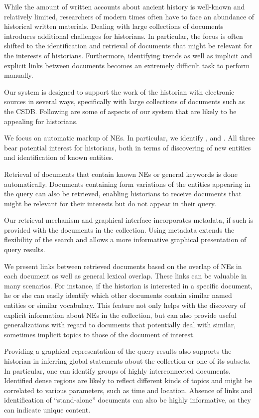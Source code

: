 While the amount of written accounts about ancient history is well-known and relatively limited, researchers of modern times often have to 
face an abundance of historical written materials. Dealing with large collections of documents introduces additional challenges for historians. 
In particular, the focus is often shifted to the identification and retrieval of documents that might be relevant for the interests of 
historians. Furthermore, identifying trends as well as implicit and explicit links between documents becomes an extremely difficult task to 
perform manually.

Our system is designed to support the work of the historian with electronic sources in several ways, specifically with large collections of documents such as the CSDB. Following are some of aspects of our system that are likely to be appealing for historians.

We focus on automatic markup of NEs. In particular, we identify ,  and . All three bear potential 
interest for historians, both in terms of discovering of new entities and identification of known entities. 

Retrieval of documents that contain known NEs or general keywords is done automatically. Documents containing form variations of 
the entities appearing in the query can also be retrieved, enabling historians to receive documents that might be relevant for their interests 
but do not appear in their query.

Our retrieval mechanism and graphical interface incorporates metadata, if such is provided with the documents in the collection. 
Using metadata extends the flexibility of the search and allows a more informative graphical presentation of query results.

We present links between retrieved documents based on the overlap of NEs in each document as well as general lexical overlap. These links can be valuable in many scenarios. 
For instance, if the historian is interested in a specific document, he or she can easily identify which other documents contain similar named 
entities or similar vocabulary. This feature not only helps with the discovery of explicit information about NEs in the 
collection, but can also provide useful generalizations with regard to documents that potentially deal with similar, sometimes implicit 
topics to those of the document of interest.   

Providing a graphical representation of the query results also supports the historian in inferring global statements about the collection or 
one of its subsets. In particular, one can identify groups of highly interconnected documents. Identified dense regions are likely to reflect 
different kinds of topics and might be correlated to various parameters, such as time and location. Absence of links and identification of 
``stand-alone'' documents can also be highly informative, as they can indicate unique content. 

